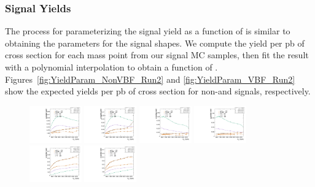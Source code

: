 \subsubsection{Signal Yields}

The process for parameterizing the signal yield as a function of \MX is similar to obtaining the parameters for the signal shapes.
We compute the yield per pb of cross section for each mass point from our signal MC samples, then fit the result with a polynomial interpolation to obtain a function of \MX.
Figures~\ref{fig:YieldParam_NonVBF_Run2} and \ref{fig:YieldParam_VBF_Run2} show the expected yields per pb of cross section for non-\VBF and \VBF signals, respectively.

\begin{figure}[htbp]
  \centering
  \includegraphics[width=0.2\textwidth]{fig/analysis/paramSignalYield_NonVBFSig_mu_HP_bb_DEtaLo.pdf}
  \includegraphics[width=0.2\textwidth]{fig/analysis/paramSignalYield_NonVBFSig_e_HP_bb_DEtaLo.pdf}
  \includegraphics[width=0.2\textwidth]{fig/analysis/paramSignalYield_NonVBFSig_mu_LP_bb_DEtaLo.pdf}
  \includegraphics[width=0.2\textwidth]{fig/analysis/paramSignalYield_NonVBFSig_e_LP_bb_DEtaLo.pdf}\\
  \includegraphics[width=0.2\textwidth]{fig/analysis/paramSignalYield_NonVBFSig_mu_HP_nobb_DEtaLo.pdf}
  \includegraphics[width=0.2\textwidth]{fig/analysis/paramSignalYield_NonVBFSig_e_HP_nobb_DEtaLo.pdf}

\end{figure}
